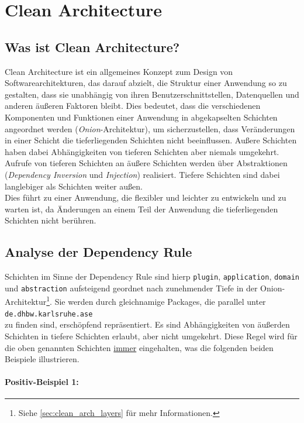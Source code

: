 \chapter{Clean Architecture}

\section{Was ist Clean Architecture?}

Clean Architecture ist ein allgemeines Konzept zum Design von Softwarearchitekturen, das darauf abzielt, 
die Struktur einer Anwendung so zu gestalten, dass sie unabhängig von ihren Benutzerschnittstellen, 
Datenquellen und anderen äußeren Faktoren bleibt. 
Dies bedeutet, dass die verschiedenen Komponenten 
und Funktionen einer Anwendung in abgekapselten Schichten angeordnet werden (\textit{Onion}-Architektur), 
um sicherzustellen, dass Veränderungen in einer Schicht die tieferliegenden Schichten nicht beeinflussen. 
Außere Schichten haben dabei Abhängigkeiten von tieferen Schichten aber niemals umgekehrt.
Aufrufe von tieferen Schichten an äußere Schichten werden über Abstraktionen (\textit{Dependency Inversion} und 
\textit{Injection}) realisiert. Tiefere Schichten sind dabei langlebiger als Schichten weiter außen. \\
Dies führt zu einer Anwendung, die flexibler und leichter zu entwickeln und zu warten ist, 
da Änderungen an einem Teil der Anwendung die tieferliegenden Schichten nicht berühren.

\section{Analyse der Dependency Rule}

Schichten im Sinne der Dependency Rule sind hierp \texttt{plugin}, \texttt{application}, \texttt{domain} 
und \texttt{abstraction} aufsteigend geordnet nach zunehmender Tiefe in der Onion-Architektur\footnote{Siehe \autoref{sec:clean_arch_layers} für mehr Informationen.}. 
Sie werden durch gleichnamige Packages, die parallel unter \\ 
\texttt{de.dhbw.karlsruhe.ase} \\
zu finden sind, erschöpfend repräsentiert. 
Es sind Abhängigkeiten von äußerden Schichten in tiefere Schichten erlaubt, aber nicht umgekehrt.
Diese Regel wird für die oben genannten Schichten \underline{immer} eingehalten, 
was die folgenden beiden Beispiele illustrieren.  

\subsubsection{Positiv-Beispiel 1:}

